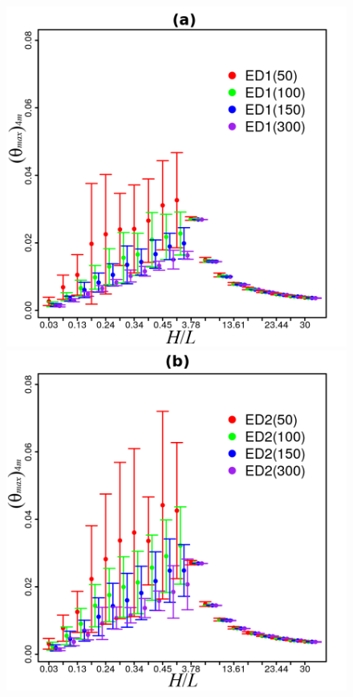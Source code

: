 \documentclass[12pt,A4,A4pt]{article}
\begin{document}
\begin{figure}[htbp]
\centering
\includegraphics[scale=.98]{imgs/plot_de1_rdata_std.png}
\quad
\includegraphics[scale=.98]{imgs/plot_de2_rdata_std.png}

\end{figure}
\end{document}
